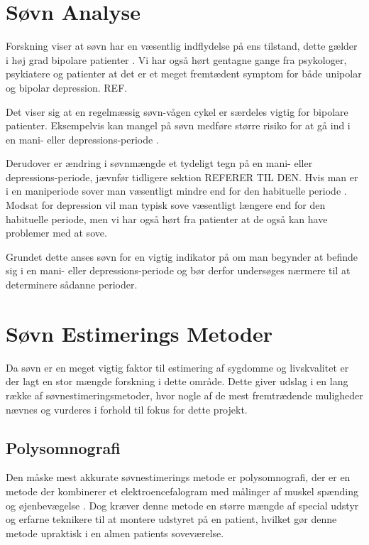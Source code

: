 \section{Søvn Analyse}
Forskning viser at søvn har en væsentlig indflydelse på ens tilstand, dette gælder i høj grad bipolare patienter \citep{CPSP:CPSP1164}.
Vi har også hørt gentagne gange fra psykologer, psykiatere og patienter at det er et meget fremtædent symptom for både unipolar og bipolar depression. REF.

Det viser sig at en regelmæssig søvn-vågen cykel er særdeles vigtig for bipolare patienter.
Eksempelvis kan mangel på søvn medføre større risiko for at gå ind i en mani- eller depressions-periode \citep{CPSP:CPSP1164}.

Derudover er ændring i søvnmængde et tydeligt tegn på en mani- eller depressions-periode, jævnfør tidligere sektion REFERER TIL DEN.
Hvis man er i en maniperiode sover man væsentligt mindre end for den habituelle periode \citep{CPSP:CPSP1164}.
Modsat for depression vil man typisk sove væsentligt længere end for den habituelle periode, men vi har også hørt fra patienter at de også kan have problemer med at sove.

Grundet dette anses søvn for en vigtig indikator på om man begynder at befinde sig i en mani- eller depressions-periode og bør derfor undersøges nærmere til at determinere sådanne perioder.

\section{Søvn Estimerings Metoder}
Da søvn er en meget vigtig faktor til estimering af sygdomme og livskvalitet er der lagt en stor mængde forskning i dette område.
Dette giver udslag i en lang række af søvnestimeringsmetoder, hvor nogle af de mest fremtrædende muligheder nævnes og vurderes i forhold til fokus for dette projekt.

\subsection{Polysomnografi}
Den måske mest akkurate søvnestimerings metode er polysomnografi, der er en metode der kombinerer et elektroencefalogram med målinger af muskel spænding og øjenbevægelse \citep{misc:polysomnografi,misc:polysomnography}.
Dog kræver denne metode en større mængde af special udstyr og erfarne teknikere til at montere udstyret på en patient, hvilket gør denne metode upraktisk i en almen patients soveværelse.

